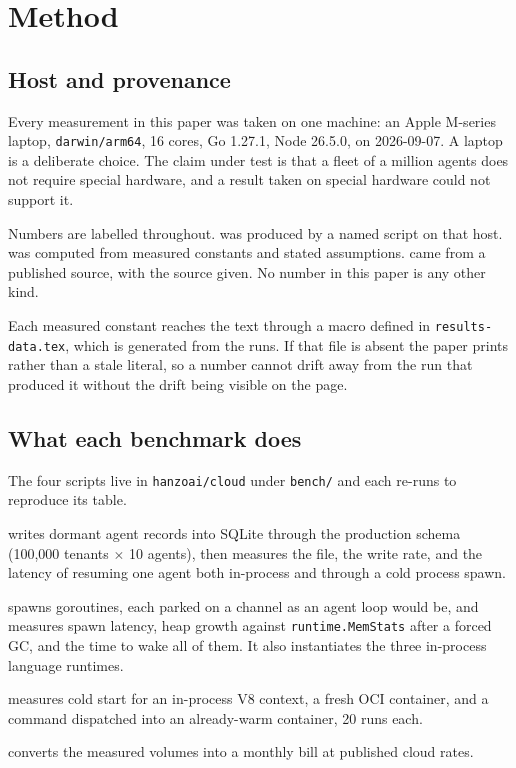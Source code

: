 \section{Method}
\label{sec:method}

\subsection{Host and provenance}

Every measurement in this paper was taken on one machine: an Apple M-series
laptop, \texttt{darwin/arm64}, 16 cores, Go 1.27.1, Node 26.5.0, on 2026-09-07.
A laptop is a deliberate choice. The claim under test is that a fleet of a
million agents does not require special hardware, and a result taken on special
hardware could not support it.

Numbers are labelled throughout. \meas{} was produced by a named script on that
host. \modeled{} was computed from measured constants and stated assumptions.
\cited{} came from a published source, with the source given. No number in this
paper is any other kind.

Each measured constant reaches the text through a macro defined in
\texttt{results-data.tex}, which is generated from the runs. If that file is
absent the paper prints \ph{} rather than a stale literal, so a number cannot
drift away from the run that produced it without the drift being visible on the
page.

\subsection{What each benchmark does}

The four scripts live in \texttt{hanzoai/cloud} under \texttt{bench/} and each
re-runs to reproduce its table.

\begin{description}[leftmargin=1.2cm,style=nextline]
\item[\texttt{fleet/fleet.mjs}] writes \rFleetAgents{} dormant agent records
  into SQLite through the production schema (100{,}000 tenants $\times$ 10
  agents), then measures the file, the write rate, and the latency of resuming
  one agent both in-process and through a cold process spawn.
\item[\texttt{goroutine/main.go}] spawns \rFleetAgents{} goroutines, each parked
  on a channel as an agent loop would be, and measures spawn latency, heap
  growth against \texttt{runtime.MemStats} after a forced GC, and the time to
  wake all of them. It also instantiates the three in-process language runtimes.
\item[\texttt{sandbox/sandbox.mjs}] measures cold start for an in-process V8
  context, a fresh OCI container, and a command dispatched into an already-warm
  container, 20 runs each.
\item[\texttt{pricing/pricing.mjs}] converts the measured volumes into a monthly
  bill at published cloud rates.
\end{description}

